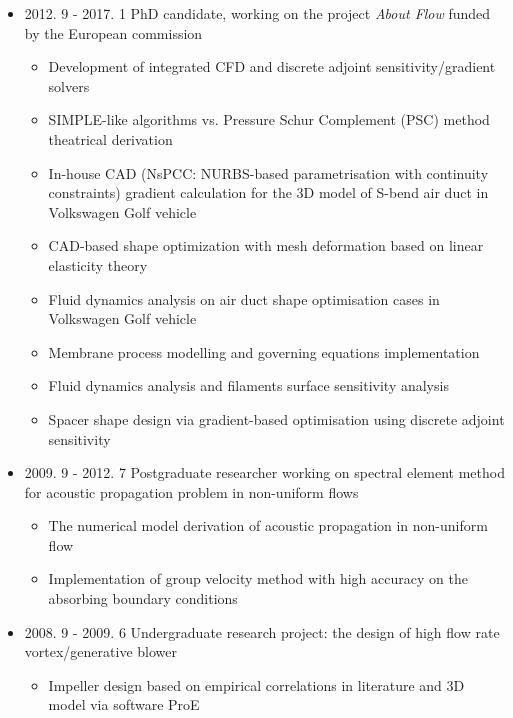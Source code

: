 \documentclass[letterpaper]{article}
\begin{document}
\begin{itemize}
\item 2012. 9 - 2017. 1  \hspace{2pt} PhD candidate, working on the project \textit{About Flow} funded by the European commission
		\begin{itemize}
		\item Development of integrated CFD and discrete adjoint sensitivity/gradient solvers
		\item	SIMPLE-like algorithms vs. Pressure Schur Complement (PSC) method theatrical derivation
		\item 
		In-house CAD (NsPCC: NURBS-based parametrisation with continuity constraints) gradient calculation for the 3D model of S-bend air duct in Volkswagen Golf vehicle
		\item	CAD-based shape optimization with mesh deformation based on linear elasticity theory
		\item	Fluid dynamics analysis on air duct shape optimisation cases in Volkswagen Golf vehicle
		\item	Membrane process modelling and governing equations implementation
		\item	Fluid dynamics analysis and filaments surface sensitivity analysis
		\item Spacer shape design via gradient-based optimisation using discrete adjoint sensitivity
		\end{itemize}
		
\item 2009. 9 - 2012. 7  \hspace{2pt} Postgraduate researcher working on spectral element method for acoustic propagation problem in non-uniform flows
		\begin{itemize}
		\item	The numerical model derivation of acoustic propagation in non-uniform flow
		\item	Implementation of group velocity method with high accuracy on the absorbing boundary conditions
		\end{itemize}

\item 2008. 9 - 2009. 6  \hspace{2pt} Undergraduate research project: the design of high flow rate vortex/generative blower
		\begin{itemize}
		\item Impeller design based on empirical correlations in literature and 3D model via software ProE
		\end{itemize}
		
\end{itemize}
\end{document}

